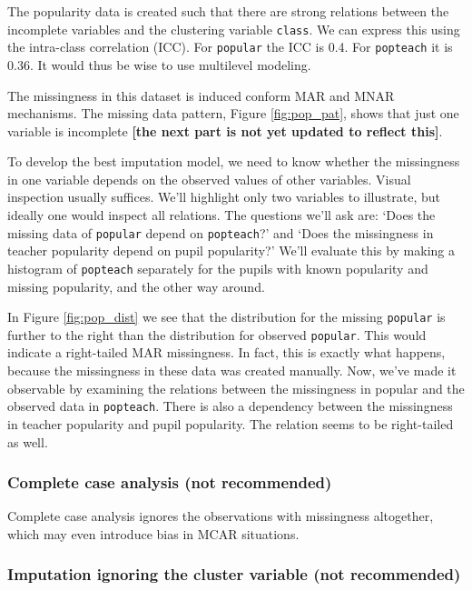 \documentclass[
]{jss}
\begin{document}
The popularity data is created such that there are strong relations
between the incomplete variables and the clustering variable
\texttt{class}. We can express this using the intra-class correlation
(ICC). For \texttt{popular} the ICC is 0.4. For \texttt{popteach} it is
0.36. It would thus be wise to use multilevel modeling.

The missingness in this dataset is induced conform MAR and MNAR
mechanisms. The missing data pattern, Figure \ref{fig:pop_pat}, shows
that just one variable is incomplete \textbf{{[}the next part is not yet
updated to reflect this{]}}.

To develop the best imputation model, we need to know whether the
missingness in one variable depends on the observed values of other
variables. Visual inspection usually suffices. We'll highlight only two
variables to illustrate, but ideally one would inspect all relations.
The questions we'll ask are: `Does the missing data of \texttt{popular}
depend on \texttt{popteach}?' and `Does the missingness in teacher
popularity depend on pupil popularity?' We'll evaluate this by making a
histogram of \texttt{popteach} separately for the pupils with known
popularity and missing popularity, and the other way around.

In Figure \ref{fig:pop_dist} we see that the distribution for the
missing \texttt{popular} is further to the right than the distribution
for observed \texttt{popular}. This would indicate a right-tailed MAR
missingness. In fact, this is exactly what happens, because the
missingness in these data was created manually. Now, we've made it
observable by examining the relations between the missingness in popular
and the observed data in \texttt{popteach}. There is also a dependency
between the missingness in teacher popularity and pupil popularity. The
relation seems to be right-tailed as well.

\hypertarget{complete-case-analysis-not-recommended}{%
\subsubsection{Complete case analysis (not
recommended)}\label{complete-case-analysis-not-recommended}}

Complete case analysis ignores the observations with missingness
altogether, which may even introduce bias in MCAR situations.

\hypertarget{imputation-ignoring-the-cluster-variable-not-recommended}{%
\subsubsection{Imputation ignoring the cluster variable (not
recommended)}\label{imputation-ignoring-the-cluster-variable-not-recommended}}
\end{document}

